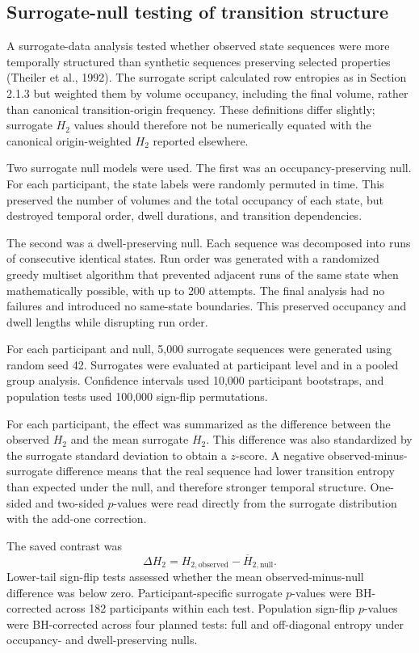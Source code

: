 \documentclass[12pt,a4paper]{report}
\begin{document}
\subsection{Surrogate-null testing of transition structure}

A surrogate-data analysis tested whether observed state sequences were more temporally structured than synthetic sequences preserving selected properties (Theiler et al., 1992). The surrogate script calculated row entropies as in Section 2.1.3 but weighted them by volume occupancy, including the final volume, rather than canonical transition-origin frequency. These definitions differ slightly; surrogate $H_2$ values should therefore not be numerically equated with the canonical origin-weighted $H_2$ reported elsewhere.

Two surrogate null models were used. The first was an occupancy-preserving null. For each participant, the state labels were randomly permuted in time. This preserved the number of volumes and the total occupancy of each state, but destroyed temporal order, dwell durations, and transition dependencies.

The second was a dwell-preserving null. Each sequence was decomposed into runs of consecutive identical states. Run order was generated with a randomized greedy multiset algorithm that prevented adjacent runs of the same state when mathematically possible, with up to 200 attempts. The final analysis had no failures and introduced no same-state boundaries. This preserved occupancy and dwell lengths while disrupting run order.

For each participant and null, 5,000 surrogate sequences were generated using random seed 42. Surrogates were evaluated at participant level and in a pooled group analysis. Confidence intervals used 10,000 participant bootstraps, and population tests used 100,000 sign-flip permutations.

For each participant, the effect was summarized as the difference between the observed $H_2$ and the mean surrogate $H_2$. This difference was also standardized by the surrogate standard deviation to obtain a $z$-score. A negative observed-minus-surrogate difference means that the real sequence had lower transition entropy than expected under the null, and therefore stronger temporal structure. One-sided and two-sided $p$-values were read directly from the surrogate distribution with the add-one correction.

The saved contrast was
\begin{equation}
\Delta H_2=H_{2,\mathrm{observed}}-\overline{H}_{2,\mathrm{null}}.
\end{equation}
Lower-tail sign-flip tests assessed whether the mean observed-minus-null difference was below zero. Participant-specific surrogate $p$-values were BH-corrected across 182 participants within each test. Population sign-flip $p$-values were BH-corrected across four planned tests: full and off-diagonal entropy under occupancy- and dwell-preserving nulls.
\end{document}
